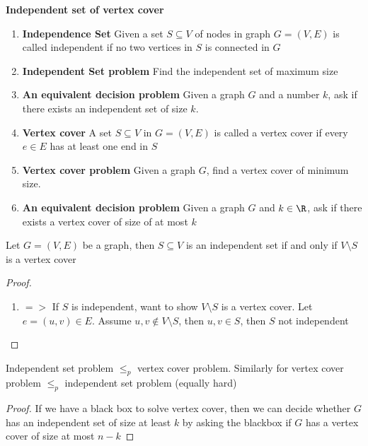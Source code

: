 \documentclass[11pt]{article}
\begin{document}
\begin{example} \textbf{Independent set of vertex cover}
    \begin{enumerate}
        \item \textbf{Independence Set} \quad Given a set $S\subseteq V$ of nodes in graph $G = (V,E)$ is called independent if no two vertices in $S$ is connected in $G$
        \item \textbf{Independent Set problem} Find the independent set of maximum size
        \item \textbf{An equivalent decision problem} Given a graph $G$ and a number $k$, ask if there exists an independent set of size $k$.
        \item \textbf{Vertex cover} A set $S\subseteq V$ in $G = (V,E)$ is called a vertex cover if every $e\in E$ has at least one end in $S$ 
        \item \textbf{Vertex cover problem} Given a graph $G$, find a vertex cover of minimum size.
        \item \textbf{An equivalent decision problem} Given a graph $G$ and $k\in \R$, ask if there exists a vertex cover of size of at most $k$
    \end{enumerate}
    \begin{lemma*}
        Let $G = (V,E)$ be a graph, then $S\subseteq V$ is an independent set if and only if $V\setminus S$ is a vertex cover
        \begin{proof}
            \begin{enumerate}
                \item $=>$ \quad If $S$ is independent, want to show $V\setminus S$ is a vertex cover. Let $e = (u,v) \in E$. Assume $u,v\not\in V\setminus S$, then $u,v\in S$, then $S$ not independent
            \end{enumerate}
        \end{proof}
    \end{lemma*}

    \begin{corollary*}
        Independent set problem $\leq_p$ vertex cover problem. Similarly for vertex cover problem $\leq_p$ independent set problem (equally hard)
        \begin{proof}
            If we have a black box to solve vertex cover, then we can decide whether $G$ has an independent set of size at least $k$ by asking the blackbox if $G$ has a vertex cover of size at most $n-k$
        \end{proof}
    \end{corollary*}

\end{example}
\end{document}
